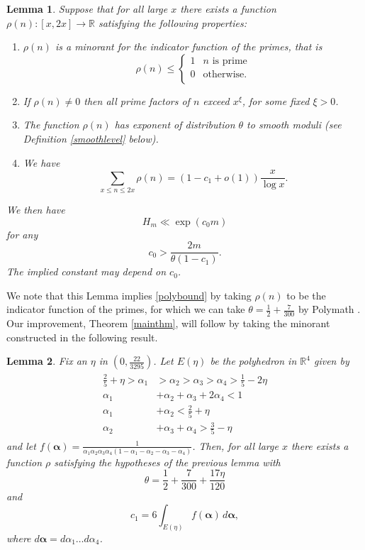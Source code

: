 \documentclass[12pt]{amsart}
\theoremstyle{plain}
\newtheorem{lem}{Lemma}
\theoremstyle{definition}
\newcommand{\bs}{\boldsymbol}
\numberwithin{equation}{section}
\def \a{\alpha} \def \b{\beta} \def \d{\delta} \def \e{\varepsilon} \def \g{\gamma} \def \k{\kappa} \def \l{\lambda} \def \s{\sigma} \def \t{\theta} \def \z{\zeta}
\newcommand{\R}{\mathbb R}
\begin{document}
\begin{lem}\label{sievelem}
Suppose that for all large $x$ there exists a function $\rho(n):[x,2x]\rightarrow \R$ satisfying the following properties:

\begin{enumerate}
\item $\rho(n)$ is a minorant for the indicator function of the primes, that is 
$$\rho(n)\leq \begin{cases}
1 & n\text{ is prime}\\
0 & \text{otherwise.}\\
\end{cases}$$

\item If $\rho(n)\ne 0$ then all prime factors of $n$ exceed $x^\xi$, for some fixed $\xi>0$.

\item The function $\rho(n)$ has exponent of distribution $\theta$ to smooth moduli (see Definition \ref{smoothlevel} below).   

\item We have 
$$\sum_{x\leq n\leq 2x}\rho(n)=(1-c_1+o(1))\frac{x}{\log x}.$$
\end{enumerate}
We then have 
$$H_m\ll \exp(c_0m)$$
for any 
$$c_0>
\frac{2m}{\theta(1-c_1)}.$$
The implied constant may depend on $c_0$.  
\end{lem}

We note that this Lemma implies \eqref{polybound} by taking $\rho(n)$ to be the indicator function of the primes, for which we can take $\theta=\frac{1}{2}+\frac{7}{300}$ by Polymath \cite[Theorem 2.4(i)]{polymath8a}.  Our improvement, Theorem \ref{mainthm}, will follow by taking the minorant constructed in the following result.

\begin{lem}\label{minorant}
Fix an $\eta$ in $(0,\frac{22}{3295})$.  Let $E(\eta)$ be the polyhedron in $\R^4$ given by
 \begin{align}\label{eq1.2}
 \begin{split}
\frac25+\eta>\a_1 &> \a_2 > \a_3>\a_4>\frac15-2\eta\\
\a_1 &+ \a_2 + \a_3 + 2\a_4 < 1\\
\a_1 &+ \a_2 < \frac 25 + \eta\\
\a_2 &+ \a_3 + \a_4 > \frac 35 - \eta
 \end{split} 
 \end{align}
and let $f(\bs \a) = \frac 1{\a_1\a_2\a_3\a_4(1-\a_1-\a_2-\a_3-
\a_4)}$.  Then, for all large $x$ there exists a function $\rho$ satisfying the hypotheses of the previous lemma with 
$$\theta=\frac12+\frac{7}{300}+\frac{17\eta}{120}$$
and 
\begin{equation}\label{c1def}
c_1=6\int_{E(\eta)} f(\bs \a)\,d\bs \a,
\end{equation}
where $d\bs \a = d\a_1 \ldots d\a_4$.
\end{lem}
\end{document}
